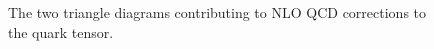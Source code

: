 \documentclass[../main.tex]{subfiles}
\begin{document}
\begin{figure}[ht!]
  \centering
  \begin{subfigure}{.49\textwidth}
    \centering
    \caption{}
    \label{pc:subfig:gluon_triangle}
  \end{subfigure}
  \begin{subfigure}{.49\textwidth}
    \centering
    \caption{}
    \label{pc:subfig:gluino_triangle}
  \end{subfigure}
  \caption{The two triangle diagrams contributing to NLO QCD corrections to the quark tensor.}
  \label{pc:fig:NLO_triangles}
\end{figure}
\end{document}
